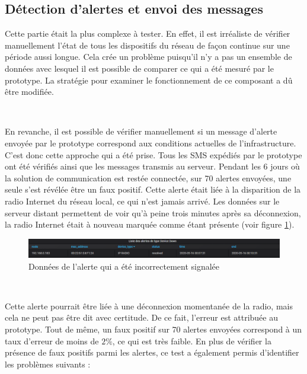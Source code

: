 \subsection{Détection d'alertes et envoi des messages}

\noindent
Cette partie était la plus complexe à tester. En effet, il est irréaliste de vérifier manuellement l'état de tous les dispositifs du réseau de façon continue sur une période aussi longue. Cela crée un problème puisqu'il n'y a pas un ensemble de données avec lesquel il est possible de comparer ce qui a été mesuré par le prototype. La stratégie pour examiner le fonctionnement de ce composant a dû être modifiée.

~

\noindent
En revanche, il est possible de vérifier manuellement si un message d'alerte envoyée par le prototype correspond aux conditions actuelles de l'infrastructure. C'est donc cette approche qui a été prise. Tous les SMS expédiés par le prototype ont été vérifiés ainsi que les messages transmis au serveur. Pendant les 6 jours où la solution de communication est restée connectée, sur 70 alertes envoyées, une seule s'est révélée être un faux positif. Cette alerte était liée à la disparition de la radio Internet du réseau local, ce qui n'est jamais arrivé. Les données sur le serveur distant permettent de voir qu'à peine trois minutes après sa déconnexion, la radio Internet était à nouveau marquée comme étant présente (voir figure \ref{fig:wrong_alert}).

\begin{figure}[ht!]
  \includegraphics[width=\textwidth]{img/tests/wrong_alert.png}
  \caption{Données de l'alerte qui a été incorrectement signalée}
  \label{fig:wrong_alert}
\end{figure}

~

\noindent
Cette alerte pourrait être liée à une déconnexion momentanée de la radio, mais cela ne peut pas être dit avec certitude. De ce fait, l'erreur est attribuée au prototype. Tout de même, un faux positif sur 70 alertes envoyées correspond à un taux d'erreur de moins de $2\%$, ce qui est très faible. En plus de vérifier la présence de faux positifs parmi les alertes, ce test a également permis d'identifier les problèmes suivants :


